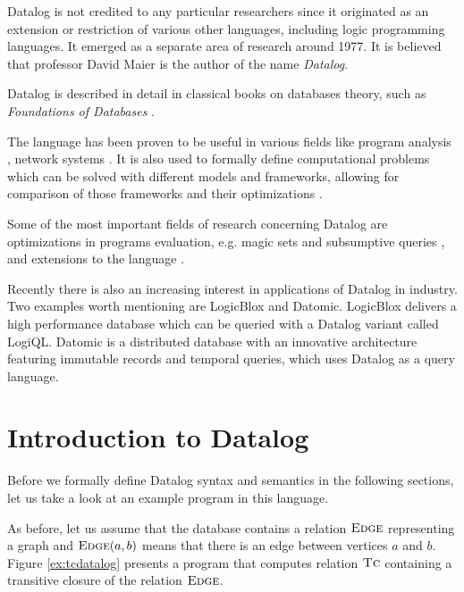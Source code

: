 Datalog is not credited to any particular researchers since it originated as an extension or restriction of various other languages, including logic programming languages. It emerged as a separate area of research around 1977. It is believed that professor David Maier is the author of the name \emph{Datalog}.

Datalog is described in detail in classical books on databases theory, such as \emph{Foundations of Databases} \cite{fod}.

The language has been proven to be useful in various fields like program analysis \cite{pointanalysis}, network systems \cite{boomanalysis, dataloganalysis}. It is also used to formally define computational problems which can be solved with different models and frameworks, allowing for comparison of those frameworks and their optimizations \cite{ullman}. 

Some of the most important fields of research concerning Datalog are optimizations in programs evaluation, e.g. magic sets \cite{magicsets} and subsumptive queries \cite{subsumptivequeries}, and extensions to the language \cite{magicsetsexist, disjunctivedatalog, datalogrelaunched}.

Recently there is also an increasing interest in applications of Datalog in industry. Two examples worth mentioning are LogicBlox and Datomic. LogicBlox \cite{logicblox} delivers a high performance database which can be queried with a Datalog variant called LogiQL.  Datomic \cite{datomic} is a distributed database with an innovative architecture featuring immutable records and temporal queries, which uses Datalog as a query language.

\section{Introduction to Datalog}

Before we formally define Datalog syntax and semantics in the following sections, let us take a look at an example program in this language.

As before, let us assume that the database contains a relation $\textsc{Edge}$ representing a graph and $\textsc{Edge}(a, b)$ means that there is an edge between vertices $a$ and $b$. Figure \ref{ex:tcdatalog} presents a program that computes relation $\textsc{Tc}$ containing a transitive closure of the relation $\textsc{Edge}$.


